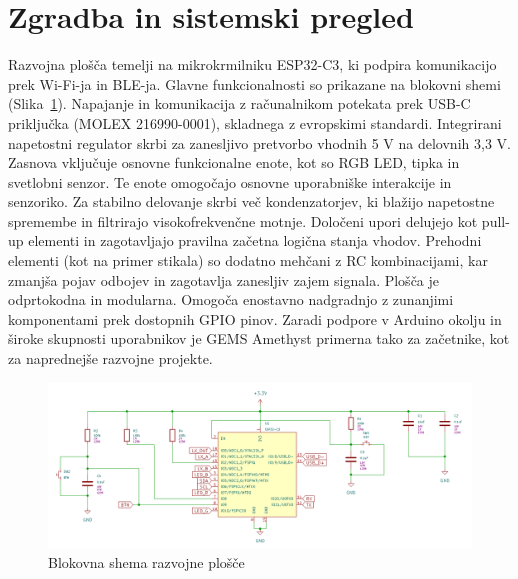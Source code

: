 \section{Zgradba in sistemski pregled}
Razvojna plošča temelji na mikrokrmilniku ESP32-C3, ki podpira komunikacijo prek Wi-Fi-ja in BLE-ja. Glavne funkcionalnosti so prikazane na blokovni shemi (Slika~\ref{fig:blok_shema}).
Napajanje in komunikacija z računalnikom potekata prek USB-C priključka (MOLEX 216990-0001), skladnega z evropskimi standardi. Integrirani napetostni regulator skrbi za zanesljivo pretvorbo vhodnih 5 V na delovnih 3,3 V. Zasnova vključuje osnovne funkcionalne enote, kot so RGB LED, tipka in svetlobni senzor. Te enote omogočajo osnovne uporabniške interakcije in senzoriko.
Za stabilno delovanje skrbi več kondenzatorjev, ki blažijo napetostne spremembe in filtrirajo visokofrekvenčne motnje. Določeni upori delujejo kot pull-up elementi in zagotavljajo pravilna začetna logična stanja vhodov. Prehodni elementi (kot na primer stikala) so dodatno mehčani z RC kombinacijami, kar zmanjša pojav odbojev in zagotavlja zanesljiv zajem signala.
Plošča je odprtokodna in modularna. Omogoča enostavno nadgradnjo z zunanjimi komponentami prek dostopnih GPIO pinov. Zaradi podpore v Arduino okolju in široke skupnosti uporabnikov je GEMS Amethyst primerna tako za začetnike, kot za naprednejše razvojne projekte.

\begin{figure}[H]
    \centering
    \includegraphics[width=1\textwidth]{Imgs/blok1.png}
    \caption{Blokovna shema razvojne plošče}
    \label{fig:blok_shema}
\end{figure}

